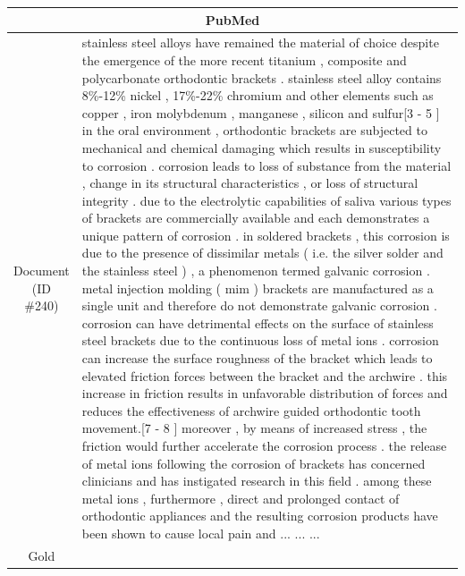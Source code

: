 \begin{table}[bth!]
\scriptsize
\centering
\renewcommand{\arraystretch}{1.3}
\begin{tabular}{c|p{}}
\hline
\multicolumn{2}{c}{PubMed} \\ \hline
\makecell{Document\\(ID \#240)} & 
stainless steel alloys have remained the material of choice despite the emergence of the more recent titanium , composite and polycarbonate orthodontic brackets . stainless steel alloy contains 8\%-12\% nickel , 17\%-22\% chromium and other elements such as copper , iron molybdenum , manganese , silicon and sulfur[3 - 5 ] in the oral environment , orthodontic brackets are subjected to mechanical and chemical damaging which results in susceptibility to corrosion . corrosion leads to loss of substance from the material , change in its structural characteristics , or loss of structural integrity . due to the electrolytic capabilities of saliva various types of brackets are commercially available and each demonstrates a unique pattern of corrosion . in soldered brackets , this corrosion is due to the presence of dissimilar metals ( i.e. the silver solder and the stainless steel ) , a phenomenon termed galvanic corrosion . metal injection molding ( mim ) brackets are manufactured as a single unit and therefore do not demonstrate galvanic corrosion . corrosion can have detrimental effects on the surface of stainless steel brackets due to the continuous loss of metal ions . corrosion can increase the surface roughness of the bracket which leads to elevated friction forces between the bracket and the archwire . this increase in friction results in unfavorable distribution of forces and reduces the effectiveness of archwire guided orthodontic tooth movement.[7 - 8 ] moreover , by means of increased stress , the friction would further accelerate the corrosion process . the release of metal ions following the corrosion of brackets has concerned clinicians and has instigated research in this field . among these metal ions , furthermore , direct and prolonged contact of orthodontic appliances and the resulting corrosion products have been shown to cause local pain and ... ... ... 
\\ \hline
Gold & 

\end{tabular}
\end{table}
